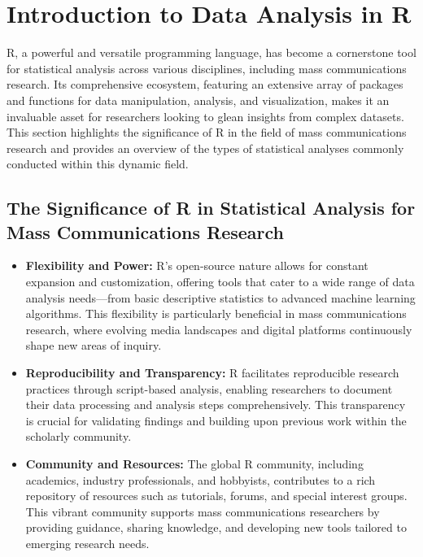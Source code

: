\documentclass[
]{book}
\begin{document}
\hypertarget{introduction-to-data-analysis-in-r}{%
\section{Introduction to Data Analysis in R}\label{introduction-to-data-analysis-in-r}}

R, a powerful and versatile programming language, has become a cornerstone tool for statistical analysis across various disciplines, including mass communications research. Its comprehensive ecosystem, featuring an extensive array of packages and functions for data manipulation, analysis, and visualization, makes it an invaluable asset for researchers looking to glean insights from complex datasets. This section highlights the significance of R in the field of mass communications research and provides an overview of the types of statistical analyses commonly conducted within this dynamic field.

\hypertarget{the-significance-of-r-in-statistical-analysis-for-mass-communications-research}{%
\subsection*{The Significance of R in Statistical Analysis for Mass Communications Research}\label{the-significance-of-r-in-statistical-analysis-for-mass-communications-research}}

\begin{itemize}
\item
  \textbf{Flexibility and Power:} R's open-source nature allows for constant expansion and customization, offering tools that cater to a wide range of data analysis needs---from basic descriptive statistics to advanced machine learning algorithms. This flexibility is particularly beneficial in mass communications research, where evolving media landscapes and digital platforms continuously shape new areas of inquiry.
\item
  \textbf{Reproducibility and Transparency:} R facilitates reproducible research practices through script-based analysis, enabling researchers to document their data processing and analysis steps comprehensively. This transparency is crucial for validating findings and building upon previous work within the scholarly community.
\item
  \textbf{Community and Resources:} The global R community, including academics, industry professionals, and hobbyists, contributes to a rich repository of resources such as tutorials, forums, and special interest groups. This vibrant community supports mass communications researchers by providing guidance, sharing knowledge, and developing new tools tailored to emerging research needs.
\end{itemize}
\end{document}
